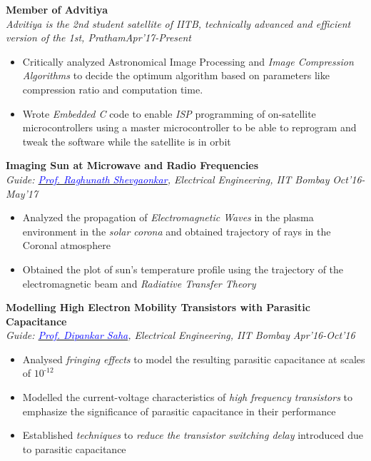 \documentclass[margin,line]{res}
\begin{document}
\begin{resume}
{\bf Member of Advitiya} \\
{\em Advitiya is the 2nd student satellite of IITB, technically advanced and efficient version of the 1st, Pratham}{\em \hfill Apr'17-Present} \\
\vspace*{-.13in}
\begin{itemize}
\item Critically analyzed Astronomical Image Processing and \emph{Image Compression Algorithms} to decide the optimum algorithm based on parameters like compression ratio and computation time.  
\item Wrote \emph{Embedded C} code to enable \emph{ISP} programming of on-satellite microcontrollers using a master microcontroller to be able to reprogram and tweak the software while the satellite is in orbit  
\end{itemize}

{\bf Imaging Sun at Microwave and Radio Frequencies} \\
{\em Guide: \href{https://www.ee.iitb.ac.in/wiki/faculty/rks}{\textcolor{blue}{Prof. Raghunath Shevgaonkar}}, Electrical Engineering, IIT Bombay} \hfill {\it Oct'16-May'17}\\
\vspace*{-.13in}
\begin{itemize}
\item Analyzed the propagation of \emph{Electromagnetic Waves} in the plasma environment in the \emph{solar corona} and obtained trajectory of rays in the Coronal atmosphere 
\item Obtained the plot of sun's temperature profile using the trajectory of the electromagnetic beam and \emph{Radiative Transfer Theory}
\end{itemize}


{\bf Modelling High Electron Mobility Transistors with Parasitic Capacitance} \\
{\em Guide: \href{https://www.ee.iitb.ac.in/wiki/faculty/dsaha}{\textcolor{blue}{Prof. Dipankar Saha}}, Electrical Engineering, IIT Bombay} \hfill {\it Apr'16-Oct'16}\\
\vspace*{-.13in}
\begin{itemize}
\item Analysed \emph{fringing effects} to model the resulting parasitic capacitance at scales of $10^\text{-12}$ 
\item Modelled the current-voltage characteristics of \emph{high frequency transistors} to emphasize the significance of parasitic capacitance in their performance
\item Established \emph{techniques}  to \emph{reduce the  transistor switching delay} introduced due to parasitic capacitance
\end{itemize}






\end{resume}
\end{document}
